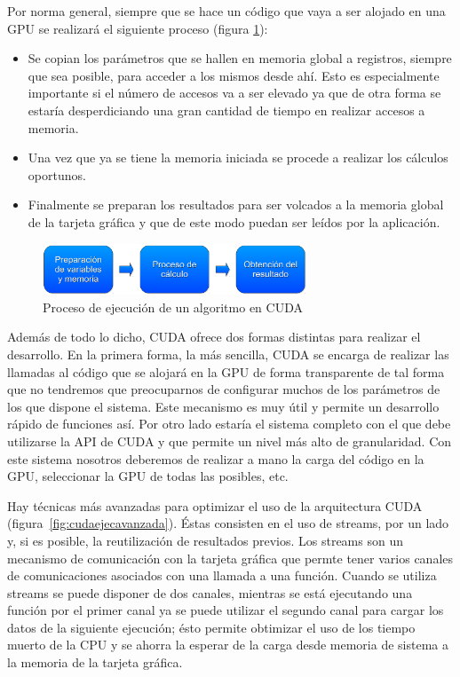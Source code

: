 Por norma general, siempre que se hace un código que vaya a ser alojado en una GPU se realizará el siguiente proceso (figura \ref{fig:procejecuda}):

\begin{itemize}
	\item Se copian los parámetros que se hallen en memoria global a registros, siempre que sea posible, para acceder a los mismos desde ahí. Esto es especialmente importante si el número de accesos va a ser elevado ya que de otra forma se estaría desperdiciando una gran cantidad de tiempo en realizar accesos a memoria.
	\item Una vez que ya se tiene la memoria iniciada se procede a realizar los cálculos oportunos.
	\item Finalmente se preparan los resultados para ser volcados a la memoria global de la tarjeta gráfica y que de este modo puedan ser leídos por la aplicación.
\end{itemize}

\begin{figure}
	\centering
	\includegraphics[width=0.7\textwidth]{images/proc_ejec1.pdf}
	\caption{Proceso de ejecución de un algoritmo en CUDA}\label{fig:procejecuda}
\end{figure}

Además de todo lo dicho, CUDA ofrece dos formas distintas para realizar el desarrollo. En la primera forma, la más sencilla, CUDA se encarga de realizar las llamadas al código que se alojará en la GPU de forma transparente de tal forma que no tendremos que preocuparnos de configurar muchos de los parámetros de los que dispone el sistema. Este mecanismo es muy útil y permite un desarrollo rápido de funciones así. Por otro lado estaría el sistema completo con el que debe utilizarse la API de CUDA y que permite un nivel más alto de granularidad. Con este sistema nosotros deberemos de realizar a mano la carga del código en la GPU, seleccionar la GPU de todas las posibles, etc.

Hay técnicas más avanzadas para optimizar el uso de la arquitectura CUDA (figura~\ref{fig:cudaejecavanzada}). Éstas consisten en el uso de streams, por un lado y, si es posible, la reutilización de resultados previos. Los streams son un mecanismo de comunicación con la tarjeta gráfica que permte tener varios canales de comunicaciones asociados con una llamada a una función. Cuando se utiliza streams se puede disponer de dos canales, mientras se está ejecutando una función por el primer canal ya se puede utilizar el segundo canal para cargar los datos de la siguiente ejecución; ésto permite obtimizar el uso de los tiempo muerto de la CPU y se ahorra la esperar de la carga desde memoria de sistema a la memoria de la tarjeta gráfica.

